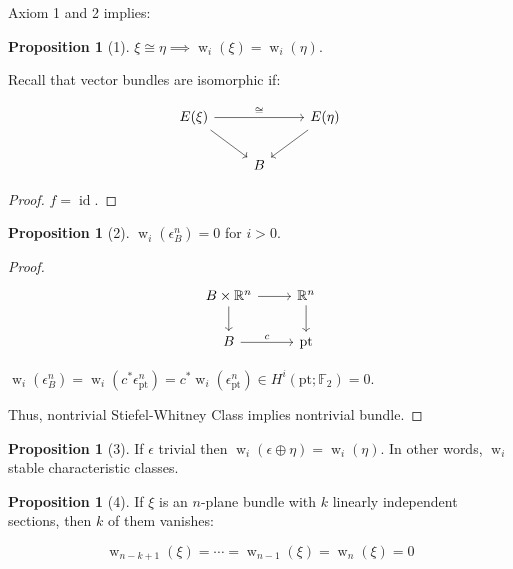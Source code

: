 \documentclass{article}
\theoremstyle{definition}
\newtheorem{proposition}[theorem]{Proposition}
\begin{document}
    Axiom 1 and 2 implies:

    \begin{proposition}
        [1] \(\xi \cong \eta \implies \operatorname{w}_i(\xi) = \operatorname{w}_i(\eta)\).
    \end{proposition}

    Recall that vector bundles are isomorphic if:

    \[
        \begin{tikzcd}
            E(\xi) \ar[rr,"\cong"] \ar[rd] & & E(\eta) \ar[dl] \\ & B
        \end{tikzcd}
    \]

    \begin{proof}
        \(f = \operatorname{id}\).
    \end{proof}

    \begin{proposition}
        [2] \(\operatorname{w}_i(\epsilon^n_B) = 0\) for \(i > 0\).  
    \end{proposition}

    \begin{proof}
        \[
            \begin{tikzcd}
                B \times \mathbb{R}^n \ar[r] \ar[d] & \mathbb{R}^n \ar[d] \\ B \ar[r,"c"] & \text{pt}
            \end{tikzcd}
        \]

        \(\operatorname{w}_i(\epsilon^n_B) = \operatorname{w}_i (c^{\ast} \epsilon^n_{\text{pt}}) = c^{\ast} \operatorname{w}_i(\epsilon^n_{\text{pt}}) \in H^i(\text{pt};\mathbb{F}_2) = 0\).
        
        Thus, nontrivial Stiefel-Whitney Class implies nontrivial bundle.

    \end{proof}

    \begin{proposition}
        [3] If \(\epsilon\) trivial then \(\operatorname{w}_i(\epsilon \oplus \eta) = \operatorname{w}_i(\eta)\). In other words, \(\operatorname{w}_i\) stable characteristic classes.
    \end{proposition}

    \begin{proposition}
        [4] If \(\xi\) is an \(n\)-plane bundle with \(k\) linearly independent sections, then \(k\) of them vanishes:

        \[
            \operatorname{w}_{n-k+1}(\xi) = \cdots = \operatorname{w}_{n-1} (\xi) = \operatorname{w}_n(\xi) = 0
        \]
    \end{proposition}
\end{document}
